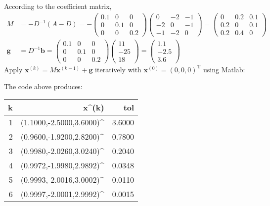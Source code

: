 \documentclass[10pt]{report}
\begin{document}
\begin{enumerate}
\begin{enumerate}
		According to the coefficient matrix,
		\begin{align*}
			M &= -D^{-1}(A-D) = -\begin{pmatrix}
			0.1 & 0 & 0\\
			0 & 0.1 & 0\\
			0 & 0 & 0.2
			\end{pmatrix}
			\begin{pmatrix}
			0 & -2 & -1\\
			-2 & 0 & -1\\
			-1 & -2 & 0
			\end{pmatrix}
			=
			\begin{pmatrix}
			0 & 0.2 & 0.1\\
			0.2 & 0 & 0.1\\
			0.2 & 0.4 & 0
			\end{pmatrix}
			\\
			\mathbf{g} &= D^{-1}\mathbf{b} = \begin{pmatrix}
			0.1 & 0 & 0\\
			0 & 0.1 & 0\\
			0 & 0 & 0.2
			\end{pmatrix}
			\begin{pmatrix}
			11\\
			-25\\
			18
			\end{pmatrix}
			=
			\begin{pmatrix}
			1.1\\
			-2.5\\
			3.6
			\end{pmatrix}
		\end{align*}
		Apply $\mathbf{x}^{(k)} = M\mathbf{x}^{(k-1)} + \mathbf{g}$ iteratively with $\mathbf{x}^{(0)} = (0, 0, 0)^\mathrm{T}$ using Matlab:
		
		The code above produces:
		\begin{table}[H]
			\centering
			\begin{tabular}{NNN} \toprule
				k & x^{(k)} & tol \\  & (1.1000,-2.5000,3.6000)^ & 3.6000\\
				2 & (0.9600,-1.9200,2.8200)^ & 0.7800\\
				3 & (0.9980,-2.0260,3.0240)^ & 0.2040\\
				4 & (0.9972,-1.9980,2.9892)^ & 0.0348\\
				5 & (0.9993,-2.0016,3.0002)^ & 0.0110\\
				6 & (0.9997,-2.0001,2.9992)^ & 0.0015\\
				\bottomrule
			\end{tabular}
		\end{table}
		

\end{enumerate}
\end{enumerate}
\end{document}
